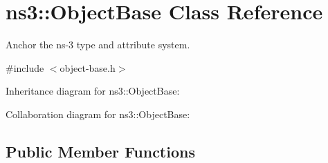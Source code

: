 \hypertarget{classns3_1_1ObjectBase}{}\section{ns3\+:\+:Object\+Base Class Reference}
\label{classns3_1_1ObjectBase}


Anchor the ns-\/3 type and attribute system.  




{\ttfamily \#include $<$object-\/base.\+h$>$}



Inheritance diagram for ns3\+:\+:Object\+Base\+:


Collaboration diagram for ns3\+:\+:Object\+Base\+:
\subsection*{Public Member Functions}
